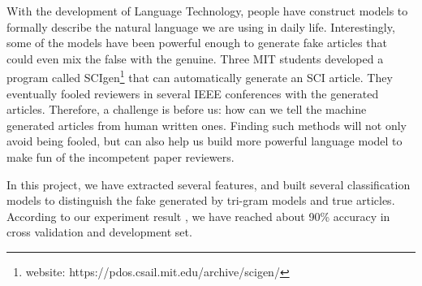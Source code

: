 With the development of Language Technology, people have construct models to formally describe the natural language we are using in daily life.
Interestingly, some of the models have been powerful enough to generate fake articles that could even mix the false with the genuine.
Three MIT students developed a program called SCIgen\footnote{website: https://pdos.csail.mit.edu/archive/scigen/} that can automatically
generate an SCI article. They eventually fooled reviewers in several IEEE conferences with the generated articles. Therefore, a challenge is before
us: how can we tell the machine generated articles from human written ones. Finding such methods will not only avoid being fooled, but
can also help us build more powerful language model to make fun of the incompetent paper reviewers. 

In this project, we have extracted several features, and built several classification models to distinguish the fake generated by tri-gram models and 
 true articles. According to our experiment result , we have reached about 90\% accuracy in cross validation and development set. 